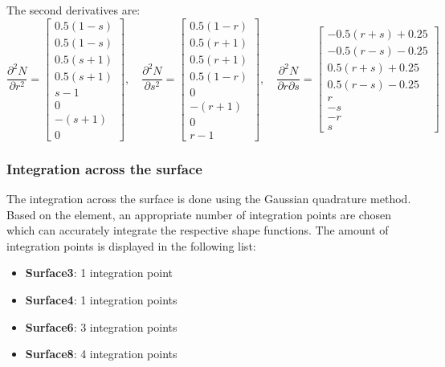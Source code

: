 The second derivatives are:
\[
\frac{\partial^2 N}{\partial r^2} =
\begin{bmatrix}
0.5 (1 - s) \\
0.5 (1 - s) \\
0.5 (s + 1) \\
0.5 (s + 1) \\
s - 1 \\
0 \\
- (s + 1) \\
0
\end{bmatrix}, \quad
\frac{\partial^2 N}{\partial s^2} =
\begin{bmatrix}
0.5 (1 - r) \\
0.5 (r + 1) \\
0.5 (r + 1) \\
0.5 (1 - r) \\
0 \\
-(r + 1) \\
0 \\
r - 1
\end{bmatrix}, \quad
\frac{\partial^2 N}{\partial r \partial s} =
\begin{bmatrix}
-0.5 (r + s) + 0.25 \\
-0.5 (r - s) - 0.25 \\
0.5 (r + s) + 0.25 \\
0.5 (r - s) - 0.25 \\
r \\
-s \\
-r \\
s
\end{bmatrix}
\]

\newpage

\subsubsection{Integration across the surface}
The integration across the surface is done using the Gaussian quadrature method.
Based on the element, an appropriate number of integration points are chosen which can accurately integrate the respective shape functions.
The amount of integration points is displayed in the following list:

\begin{itemize}
    \item \textbf{Surface3}: 1 integration point
    \item \textbf{Surface4}: 1 integration points
    \item \textbf{Surface6}: 3 integration points
    \item \textbf{Surface8}: 4 integration points
\end{itemize}

